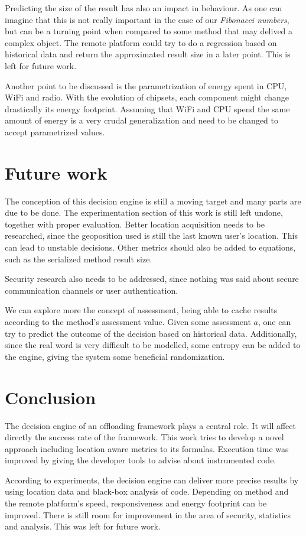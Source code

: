 \documentclass[10pt, conference, letterpaper]{IEEEtran}
\begin{document}
  Predicting the size of the result has also an impact in behaviour. As one can imagine that this is not really important in the case of our \textit{Fibonacci numbers}, but can be a turning point when compared to some method that may delived a complex object. The remote platform could try to do a regression based on historical data and return the approximated result size in a later point. This is left for future work.

  Another point to be discussed is the parametrization of energy spent in CPU, WiFi and radio. With the evolution of chipsets, each component might change drastically its energy footprint. Assuming that WiFi and CPU spend the same amount of energy is a very crudal generalization and need to be changed to accept parametrized values. 

  \section{Future work} \label{sec:futurework}

  The conception of this decision engine is still a moving target and many parts are due to be done. The experimentation section of this work is still left undone, together with proper evaluation. Better location acquisition needs to be researched, since the geoposition used is still the last known user's location. This can lead to unstable decisions. Other metrics should also be added to equations, such as the serialized method result size.

  Security research also needs to be addressed, since nothing was said about secure communication channels or user authentication.

  We can explore more the concept of assessment, being able to cache results according to the method's assessment value. Given some assessment $a$, one can try to predict the outcome of the decision based on historical data. Additionally, since the real word is very difficult to be modelled, some entropy can be added to the engine, giving the system some beneficial randomization.  

  \section{Conclusion}

  The decision engine of an offloading framework plays a central role. It will affect directly the success rate of the framework. This work tries to develop a novel approach including location aware metrics to its formulas. Execution time was improved by giving the developer tools to advise about instrumented code.

  According to experiments, the decision engine can deliver more precise results by using location data and black-box analysis of code. Depending on method and the remote platform's speed, responsiveness and energy footprint can be improved. There is still room for improvement in the area of security, statistics and analysis. This was left for future work.





\end{document}

